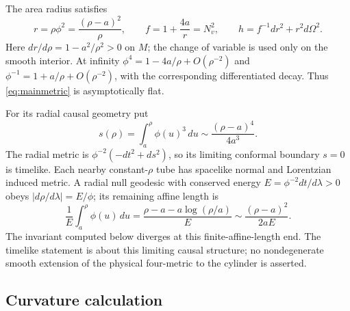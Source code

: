 \documentclass[11pt]{article}
\begin{document}
The area radius satisfies
\begin{equation}\label{eq:areal}
 r=\rho\phi^2=\frac{(\rho-a)^2}{\rho},\qquad
 f=1+\frac{4a}{r}=N_v^2,
 \qquad h=f^{-1}dr^2+r^2d\Omega^2.
\end{equation}
Here $dr/d\rho=1-a^2/\rho^2>0$ on $M$; the change of variable is used only
on the smooth interior. At infinity $\phi^4=1-4a/\rho+O(\rho^{-2})$ and
$\phi^{-1}=1+a/\rho+O(\rho^{-2})$, with the corresponding differentiated
decay. Thus \eqref{eq:mainmetric} is asymptotically flat.

For its radial causal geometry put
\[
 s(\rho)=\int_a^\rho\phi(u)^3\,du
 \sim\frac{(\rho-a)^4}{4a^3}.
\]
The radial metric is $\phi^{-2}(-dt^2+ds^2)$, so its limiting conformal
boundary $s=0$ is timelike. Each nearby constant-$\rho$ tube has spacelike
normal and Lorentzian induced metric. A radial null geodesic with conserved
energy $E=\phi^{-2}dt/d\lambda>0$ obeys $|d\rho/d\lambda|=E/\phi$; its remaining
affine length is
\[
 \frac1E\int_a^\rho\phi(u)\,du
 =\frac{\rho-a-a\log(\rho/a)}{E}
 \sim\frac{(\rho-a)^2}{2aE}.
\]
The invariant computed below diverges at this finite-affine-length end.
The timelike statement is about this limiting causal structure; no
nondegenerate smooth extension of the physical four-metric to the cylinder
is asserted.

\subsection{Curvature calculation}
\end{document}
